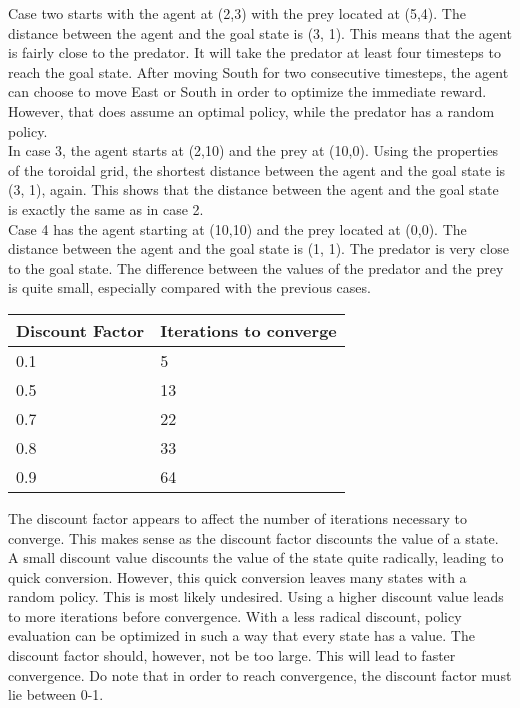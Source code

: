 \documentclass{article}
\begin{document}
Case two starts with the agent at (2,3) with the prey located at (5,4). The distance between the agent and the goal state is (3, 1). This means that the agent is fairly close to the predator. It will take the predator at least four timesteps to reach the goal state. After moving South for two consecutive timesteps, the agent can choose to move East or South in order to optimize the immediate reward. However, that does assume an optimal policy, while the predator has a random policy. \\

In case 3, the agent starts at (2,10) and the prey at (10,0). Using the properties of the toroidal grid, the shortest distance between the agent and the goal state is (3, 1), again. This shows that the distance between the agent and the goal state is exactly the same as in case 2. \\ 

Case 4 has the agent starting at (10,10) and the prey located at (0,0). The distance between the agent and the goal state is (1, 1). The predator is very close to the goal state. The difference between the values of the predator and the prey is quite small, especially compared with the previous cases.  \\


\begin{center}
	\begin{tabular}{ l || l }
		Discount Factor & Iterations to converge \\ 
		\hline
		0.1 & 5 \\
		0.5 & 13 \\
		0.7 & 22 \\
		0.8 & 33 \\
		0.9 & 64 \\	
	\end{tabular}
\end{center}

The discount factor appears to affect the number of iterations necessary to converge. This makes sense as the discount factor discounts the value of a state. A small discount value discounts the value of the state quite radically, leading to quick conversion. However, this quick conversion leaves many states with a random policy. This is most likely undesired. Using a higher discount value leads to more iterations before convergence. With a less radical discount, policy evaluation can be optimized in such a way that every state has a value. The discount factor should, however, not be too large. This will lead to faster convergence. Do note that in order to reach convergence, the discount factor must lie between 0-1.
\end{document}

